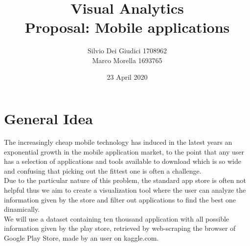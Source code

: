 \documentclass[a4paper, 11pt]{article}
\title { Visual Analytics\\ \bigskip \large Proposal: Mobile applications}
\date{23 April 2020}
\author{Silvio Dei Giudici 1708962 \\ Marco Morella 1693765}
\begin{document}
\maketitle

\section{General Idea}
The increasingly cheap mobile technology has induced in the latest years an exponential growth in the mobile application market, to the point that any user has a selection of applications and tools available to download which is so wide and confusing that picking out the fittest one is often a challenge.\\
Due to the particular nature of this problem, the standard app store is often not helpful thus we aim to create a visualization tool where the user can analyze the information given by the store and filter out applications to find the best one dinamically.\\
We will use a dataset containing ten thousand application with all possible information given by the play store, retrieved by web-scraping the browser of Google Play Store, made by an user on kaggle.com.\\
\end{document}
